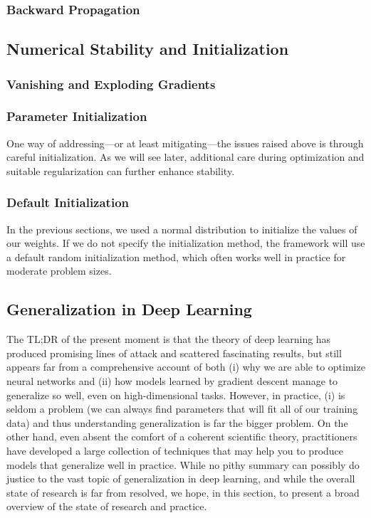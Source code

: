 \documentclass[a4paper,12pt]{article}
\theoremstyle{definition}
\begin{document}
\subsubsection*{Backward Propagation}



\subsection*{Numerical Stability and Initialization}
\subsubsection*{Vanishing and Exploding Gradients}

\subsubsection*{Parameter Initialization}
One way of addressing—or at least mitigating—the issues raised above is through careful initialization. As we will see later, additional care during optimization and
suitable regularization can further enhance stability.

\subsubsection*{Default Initialization}
In the previous sections, we used a normal distribution to initialize the values of our weights. If we do not specify the initialization method, the framework will
use a default random initialization method, which often works well in practice for moderate problem sizes.

\subsection*{Generalization in Deep Learning}
The TL;DR of the present moment is that the theory of deep learning has produced promising lines of attack and scattered fascinating results, but still appears far
from a comprehensive account of both (i) why we are able to optimize neural networks and (ii) how models learned by gradient descent manage to generalize so well,
even on high-dimensional tasks. However, in practice, (i) is seldom a problem (we can always find parameters that will fit all of our training data) and thus understanding
generalization is far the bigger problem. On the other hand, even absent the comfort of a coherent scientific theory, practitioners have developed a large collection
of techniques that may help you to produce models that generalize well in practice. While no pithy summary can possibly do justice to the vast topic of generalization
in deep learning, and while the overall state of research is far from resolved, we hope, in this section, to present a broad overview of the state of research and practice.
\end{document}
